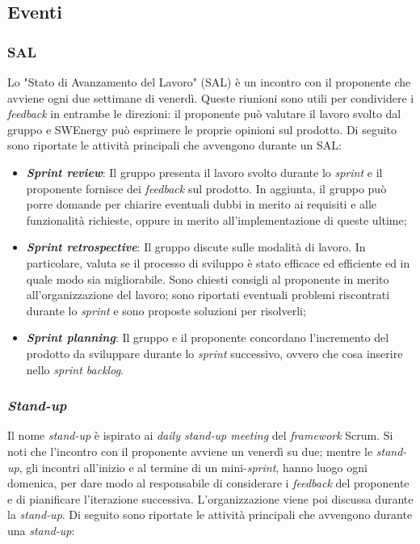 \subsection{Eventi}

\subsubsection{SAL}
Lo "Stato di Avanzamento del Lavoro" (SAL) è un incontro con il proponente che
avviene ogni due settimane di venerdì. Queste riunioni sono utili per
condividere i \textit{feedback} in entrambe le direzioni: il proponente può
valutare il lavoro svolto dal gruppo e SWEnergy può esprimere le proprie
opinioni sul prodotto. Di seguito sono riportate le attività principali che
avvengono durante un SAL:

\begin{itemize}
	\item \textbf{\textit{Sprint review}}: Il gruppo presenta il lavoro svolto
	      durante lo
	      \textit{sprint} e il proponente fornisce dei \textit{feedback} sul
	      prodotto. In aggiunta, il gruppo può porre domande per chiarire
	      eventuali dubbi in merito ai requisiti e alle funzionalità richieste,
	      oppure in merito all'implementazione di queste ultime;

	\item \textbf{\textit{Sprint retrospective}}: Il gruppo discute sulle modalità
	      di lavoro. In particolare, valuta se il processo di sviluppo
	      è stato efficace ed efficiente ed in quale modo sia migliorabile.
	      Sono chiesti consigli al proponente in merito all'organizzazione del
	      lavoro; sono riportati eventuali problemi riscontrati durante lo
	      \textit{sprint} e sono proposte soluzioni per risolverli;

	\item \textbf{\textit{Sprint planning}}: Il gruppo e il proponente concordano
	      l'incremento del prodotto da sviluppare durante lo \textit{sprint}
	      successivo, ovvero che cosa inserire nello \textit{sprint backlog}.
\end{itemize}

\subsubsection{\textit{Stand-up}}
Il nome \textit{stand-up} è ispirato ai \textit{daily stand-up meeting} del
\textit{framework} Scrum. Si noti che l'incontro con il proponente avviene un
venerdì su due; mentre le \textit{stand-up}, gli incontri all'inizio
e al termine di un mini-\textit{sprint}, hanno luogo ogni domenica,
per dare modo al responsabile di considerare i \textit{feedback} del proponente
e di pianificare l'iterazione successiva. L'organizzazione viene poi discussa
durante la \textit{stand-up}. Di seguito sono riportate le attività principali
che avvengono durante una \textit{stand-up}:

